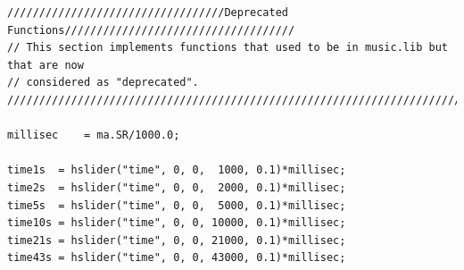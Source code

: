 \documentclass{article}
\begin{document}
\begin{lstlisting}[caption=\texttt{basics.lib}]
//////////////////////////////////Deprecated Functions////////////////////////////////////
// This section implements functions that used to be in music.lib but that are now
// considered as "deprecated".
//////////////////////////////////////////////////////////////////////////////////////////

millisec	= ma.SR/1000.0;

time1s 	= hslider("time", 0, 0,  1000, 0.1)*millisec;
time2s 	= hslider("time", 0, 0,  2000, 0.1)*millisec;
time5s 	= hslider("time", 0, 0,  5000, 0.1)*millisec;
time10s = hslider("time", 0, 0, 10000, 0.1)*millisec;
time21s = hslider("time", 0, 0, 21000, 0.1)*millisec;
time43s = hslider("time", 0, 0, 43000, 0.1)*millisec;
\end{lstlisting}
\end{document}
